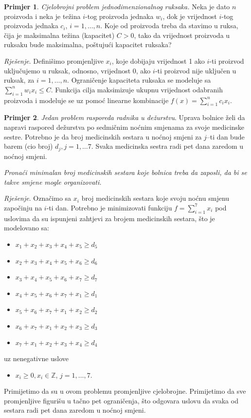 \documentclass[b5paper, utf8, 11pt, colorlinks]{book}
\theoremstyle{definition}
\newtheorem{primjer}{Primjer}[chapter]
\begin{document}
\begin{primjer}
	\emph{Cjelobrojni problem jednodimenzionalnog ruksaka.} Neka je dato $n$ proizvoda i neka je težina $i$-tog proizvoda jednaka $w_i$, dok je vrijednost $i$-tog proizvoda jednaka $c_i$, $i=1,\ldots,n$. Koje od proizvoda treba da stavimo u ruksa, čija je maksimalna težina (kapacitet) $C>0$, tako da   vrijednost proizvoda u ruksaku bude maksimalna, poštujući  kapacitet  ruksaka? 
	
	\emph{Rješenje}. Definišimo promjenljive $x_i$, koje dobijaju vrijednost 1 ako  $i$-ti proizvod uključujemo u ruksak, odnosno, vrijednost 0, ako $i$-ti proizvod nije uključen u ruksak, za $i=1,\ldots,n$. Ograničenje kapaciteta ruksaka se modeluje sa $\sum_{i=1}^n w_i x_i \leq C$. Funkcija cilja maksimizuje ukupnu vrijednost odabranih proizvoda i modeluje se uz pomoć linearne kombinacije $f(x) = \sum_{i=1}^n c_i x_i$. 
\end{primjer}
\begin{primjer}
	\emph{Jedan problem rasporeda radnika u dežurstvu}. Uprava bolnice želi da napravi raspored dežurstva po sedmičnim noćnim smjenama za svoje medicinske sestre.  Potrebno je da broj medicinskih sestara u noćnoj smjeni za $j$--ti dan bude barem (cio broj) $d_j, j = 1,\ldots 7$. Svaka
	medicinska sestra radi pet dana zaredom u noćnoj smjeni. 
	
	\emph{Pronaći minimalan broj medicinskih sestara koje bolnica treba da zaposli, da bi se takve smjene mogle organizovati.}
	
	\emph{Rješenje}. Označimo sa $x_i$ broj medicinskih sestara koje svoju noćnu smjenu započinju na $i$-ti dan. Potrebno je minimizovati funkciju 
	$f = \sum_{i=1}^7 x_i$ pod uslovima da su ispunjeni zahtjevi za brojem medicinskih sestara, što je modelovano sa:
	\begin{itemize}
		\item $x_1 + x_2 + x_3 + x_4 + x_5 \geq d_5 $
		\item $x_2 + x_3 + x_4 + x_5 + x_6 \geq d_6$
		\item $x_3 + x_4 + x_5 + x_6 + x_7 \geq d_7$
		\item $x_4 + x_5 + x_6 + x_7 + x_1 \geq d_1 $
		\item $x_5 + x_6 + x_7 + x_1 + x_2   \geq d_2$
		\item $x_6 + x_7 + x_1 + x_2 + x_3  \geq d_3$
		\item $  x_7 + x_1 + x_2 + x_3 + x_4 \geq d_4$
	\end{itemize}
	uz nenegativne uslove 
	\begin{itemize}
		\item $x_i \geq 0, x_i \in \mathbb{Z}$, $j=1,\ldots,7.$
	\end{itemize}
	Primijetimo da su u ovom problemu promjenljive  cjelobrojne. Primijetimo da sve promjenljive figurišu u tačno pet ograničenja, što odgovara uslovu da svaka od sestara radi pet dana zaredom u noćnoj smjeni.
\end{primjer}
\end{document}
